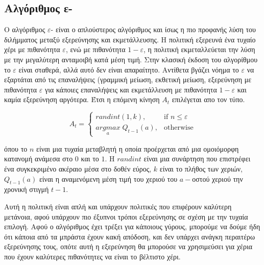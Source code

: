 \subsection{Αλγόριθμος ε-}

Ο αλγόριθμος $ε$- είναι ο απλούστερος αλγόριθμος και ίσως η πιο προφανής λύση του διλήμματος μεταξύ εξερεύνησης και εκμετάλλευσης. Η πολιτική εξερευνά ένα τυχαίο χέρι με πιθανότητα $ε$, ενώ με πιθανότητα $1-ε$, η πολιτική εκμεταλλεύεται την λύση με την μεγαλύτερη ανταμοιβή κατά μέση τιμή. Στην κλασική έκδοση του αλγορίθμου το $ε$ είναι σταθερά, αλλά αυτό δεν είναι απαραίτητο. Αντίθετα βγάζει νόημα το $ε$ να εξαρτάται από τις επαναλήψεις (γραμμική μείωση, εκθετική μείωση, εξερεύνηση με πιθανότητα $ε$ για κάποιες επαναλήψεις και εκμετάλλευση με πιθανότητα $1-ε$ και καμία εξερεύνηση αργότερα. Έτσι η επόμενη κίνηση $A_t$ επιλέγεται απο τον τύπο.

\begin{otherlanguage}{english}
    \begin{equation*}
        A_t = \begin{cases}
            randint(1,k),                     & \text{if } n \leq ε \\
            \underset{a}{argmax}\;Q_{t-1}(a), & \text{otherwise}
        \end{cases}
    \end{equation*}
\end{otherlanguage}

όπου το $n$ είναι μια τυχαία μεταβλητή η οποία προέρχεται από μια ομοιόμορφη κατανομή ανάμεσα στο $0$ και το $1$. Η $randint$ είναι μια συνάρτηση που επιστρέφει ένα συγκεκριμένο ακέραιο μέσα στο δοθέν εύρος, $k$ είναι το πλήθος των χεριών, $Q_{t-1}(a)$ είναι η αναμενόμενη μέση τιμή του χεριού του $a-$οστού χεριού την χρονική στιγμή $t-1$.

Αυτή η πολιτική είναι απλή και υπάρχουν πολιτικές που επιφέρουν καλύτερη μετάνοια, αφού υπάρχουν πιο έξυπνοι τρόποι εξερεύνησης σε σχέση με την τυχαία επιλογή. Αφού ο αλγόριθμος έχει τρέξει για κάποιους γύρους, μπορούμε να δούμε ήδη ότι κάποια από τα μπράστα έχουν κακή απόδοση, και δεν υπάρχει ανάγκη περαιτέρω εξερεύνησης τους, οπότε αυτή η εξερεύνηση θα μπορούσε να χρησιμεύσει για χέρια που έχουν καλύτερες πιθανότητες να είναι το βέλτιστο χέρι.

\subsection{}

